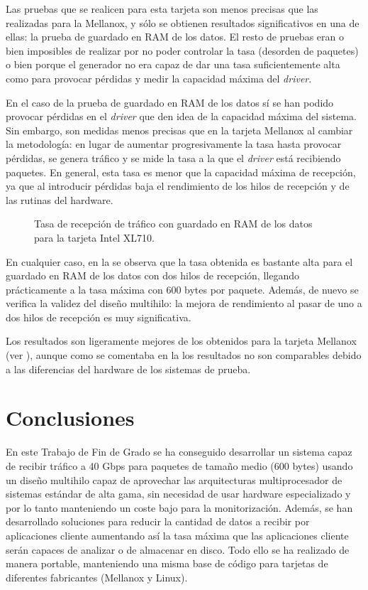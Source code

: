 \documentclass[twoside, 12pt]{epstfg}
\begin{document}
Las pruebas que se realicen para esta tarjeta son menos precisas que las realizadas para la Mellanox, y sólo se obtienen resultados significativos en una de ellas: la prueba de guardado en RAM de los datos. El resto de pruebas eran o bien imposibles de realizar por no poder controlar la tasa (desorden de paquetes) o bien porque el generador no era capaz de dar una tasa suficientemente alta como para provocar pérdidas y medir la capacidad máxima del \textit{driver}.

En el caso de la prueba de guardado en RAM de los datos sí se han podido provocar pérdidas en el \textit{driver} que den idea de la capacidad máxima del sistema. Sin embargo, son medidas menos precisas que en la tarjeta Mellanox al cambiar la metodología: en lugar de aumentar progresivamente la tasa hasta provocar pérdidas, se genera tráfico y se mide la tasa a la que el \textit{driver} está recibiendo paquetes. En general, esta tasa es menor que la capacidad máxima de recepción, ya que al introducir pérdidas baja el rendimiento de los hilos de recepción y de las rutinas del hardware.

\begin{figure}[hbtp]
\caption[Tasa de recepción para la tarjeta Intel XL710]{Tasa de recepción de tráfico con guardado en RAM de los datos para la tarjeta Intel XL710.}
\label{fig:Validacion:IntelHpcapdd}
\end{figure}

En cualquier caso, en la  se observa que la tasa obtenida es bastante alta para el guardado en RAM de los datos con dos hilos de recepción, llegando prácticamente a la tasa máxima con 600 bytes por paquete. Además, de nuevo se verifica la validez del diseño multihilo: la mejora de rendimiento al pasar de uno a dos hilos de recepción es muy significativa.

Los resultados son ligeramente mejores de los obtenidos para la tarjeta Mellanox (ver ), aunque como se comentaba en la  los resultados no son comparables debido a las diferencias del hardware de los sistemas de prueba.

\chapter{Conclusiones}
\label{chap:Conclusiones}

En este Trabajo de Fin de Grado se ha conseguido desarrollar un sistema capaz de recibir tráfico a 40 Gbps para paquetes de tamaño medio (600 bytes) usando un diseño multihilo capaz de aprovechar las arquitecturas multiprocesador de sistemas estándar de alta gama, sin necesidad de usar hardware especializado y por lo tanto manteniendo un coste bajo para la monitorización. Además, se han desarrollado soluciones para reducir la cantidad de datos a recibir por aplicaciones cliente aumentando así la tasa máxima que las aplicaciones cliente serán capaces de analizar o de almacenar en disco. Todo ello se ha realizado de manera portable, manteniendo una misma base de código para tarjetas de diferentes fabricantes (Mellanox y Linux).
\end{document}
